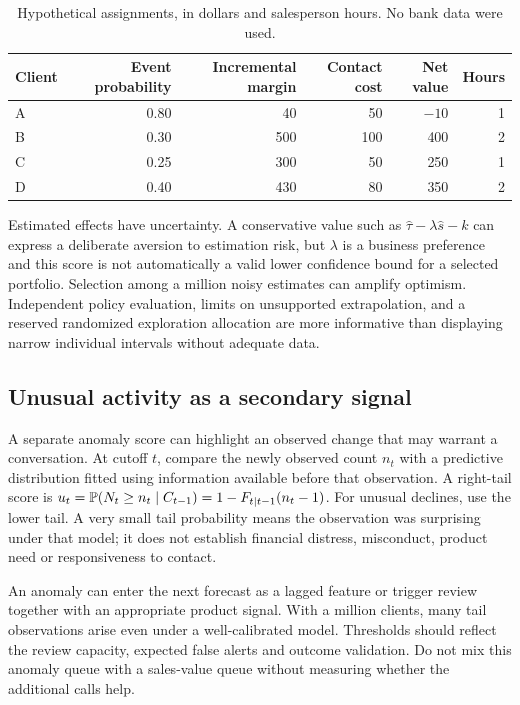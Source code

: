 \begin{table}[htbp]
\centering
\caption{Hypothetical assignments, in dollars and salesperson hours. No bank data were used.}
\label{tab:queue}
\begin{tabular}{lrrrrr}
\toprule
Client & Event probability & Incremental margin & Contact cost & Net value & Hours\\
\midrule
A & 0.80 & 40 & 50 & $-10$ & 1\\
B & 0.30 & 500 & 100 & 400 & 2\\
C & 0.25 & 300 & 50 & 250 & 1\\
D & 0.40 & 430 & 80 & 350 & 2\\
\bottomrule
\end{tabular}
\end{table}

Estimated effects have uncertainty. A conservative value such as $\widehat\tau-\lambda\widehat s-k$ can express a deliberate aversion to estimation risk, but $\lambda$ is a business preference and this score is not automatically a valid lower confidence bound for a selected portfolio. Selection among a million noisy estimates can amplify optimism. Independent policy evaluation, limits on unsupported extrapolation, and a reserved randomized exploration allocation are more informative than displaying narrow individual intervals without adequate data.

\subsection{Unusual activity as a secondary signal}

A separate anomaly score can highlight an observed change that may warrant a conversation. At cutoff $t$, compare the newly observed count $n_t$ with a predictive distribution fitted using information available before that observation. A right-tail score is $u_t=\mathbb{P}(N_t\ge n_t\mid C_{t-1})=1-F_{t\mid t-1}(n_t-1)$. For unusual declines, use the lower tail. A very small tail probability means the observation was surprising under that model; it does not establish financial distress, misconduct, product need or responsiveness to contact.

An anomaly can enter the next forecast as a lagged feature or trigger review together with an appropriate product signal. With a million clients, many tail observations arise even under a well-calibrated model. Thresholds should reflect the review capacity, expected false alerts and outcome validation. Do not mix this anomaly queue with a sales-value queue without measuring whether the additional calls help.

